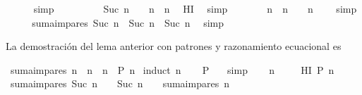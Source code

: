 \begin{isabellebody}
\ \ \ \ \isamarkupfalse%
\ simp\isanewline
\ \ \isamarkupfalse%
\ \isamarkupfalse%
\ {\isachardoublequoteopen}{\isasymdots}\ {\isacharequal}\ {\isacharparenleft}{}\ {\isacharasterisk}\ {\isacharparenleft}Suc\ n{\isacharparenright}\ {\isacharminus}\ {}{\isacharparenright}\ {\isacharplus}\ n\ {\isacharasterisk}\ n{\isachardoublequoteclose}\ \isamarkupfalse%
\ HI\ \isamarkupfalse%
\ simp\isanewline
\ \ \isamarkupfalse%
\ \isamarkupfalse%
\ {\isachardoublequoteopen}{\isasymdots}\ {\isacharequal}\ n\ {\isacharasterisk}\ n\ {\isacharplus}\ {}\ {\isacharasterisk}\ n\ {\isacharplus}\ {}{\isachardoublequoteclose}\ \isamarkupfalse%
\ simp\isanewline
\ \ \isamarkupfalse%
\ \isamarkupfalse%
\ {\isachardoublequoteopen}suma{\isacharunderscore}impares\ {\isacharparenleft}Suc\ n{\isacharparenright}\ {\isacharequal}\ {\isacharparenleft}Suc\ n{\isacharparenright}\ {\isacharasterisk}\ {\isacharparenleft}Suc\ n{\isacharparenright}{\isachardoublequoteclose}\ \isamarkupfalse%
\ simp\isanewline
{}\isamarkupfalse%
%
\endisatagproof
{\isafoldproof}%
%
\isadelimproof
%
\endisadelimproof
%
\begin{isamarkuptext}%
La demostración del lema anterior con patrones y razonamiento 
   ecuacional es%
\end{isamarkuptext}\isamarkuptrue%
\isamarkupfalse%
\ {\isachardoublequoteopen}suma{\isacharunderscore}impares\ n\ {\isacharequal}\ n\ {\isacharasterisk}\ n{\isachardoublequoteclose}\ {\isacharparenleft}\ {\isachardoublequoteopen}{\isacharquery}P\ n{\isachardoublequoteclose}{\isacharparenright}\isanewline
%
\isadelimproof
%
\endisadelimproof
%
\isatagproof
{}\isamarkupfalse%
\ {\isacharparenleft}induct\ n{\isacharparenright}\isanewline
\ \ \isamarkupfalse%
\ {\isachardoublequoteopen}{\isacharquery}P\ {}{\isachardoublequoteclose}\ \isamarkupfalse%
\ simp\isanewline
{}\isamarkupfalse%
\isanewline
\ \ \isamarkupfalse%
\ n\ \isanewline
\ \ \isamarkupfalse%
\ HI{\isacharcolon}\ {\isachardoublequoteopen}{\isacharquery}P\ n{\isachardoublequoteclose}\isanewline
\ \ \isamarkupfalse%
\ {\isachardoublequoteopen}suma{\isacharunderscore}impares\ {\isacharparenleft}Suc\ n{\isacharparenright}\ {\isacharequal}\ {\isacharparenleft}{}\ {\isacharasterisk}\ {\isacharparenleft}Suc\ n{\isacharparenright}\ {\isacharminus}\ {}{\isacharparenright}\ {\isacharplus}\ suma{\isacharunderscore}impares\ n{\isachardoublequoteclose}\ \isanewline

\end{isabellebody}
